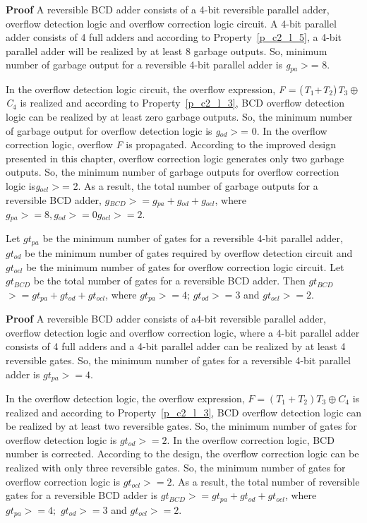 \noindent\textbf{Proof}
A reversible BCD adder consists of a 4-bit reversible parallel adder, overflow detection logic and overflow correction logic circuit. A {4}-bit parallel adder consists of 4 full adders and according to Property~\ref{p_c2_l_5}, a {4}-bit parallel adder will be realized by at least 8 garbage outputs. So, minimum number of garbage output for a reversible 4-bit parallel adder is {\it g}${}_{pa}$${>}$= 8.

In the overflow detection logic circuit, the overflow expression, {\it F }= ({\it T}${}_{1}$+{\it T}${}_{2}$){\it T}${}_{3}\oplus$ {\it C}${}_{4}$ is realized and according to Property~\ref{p_c2_l_3}, BCD overflow detection logic can be realized by at least zero garbage outputs. So, the minimum number of garbage output for overflow detection logic is {\it g}${}_{od}$${>}$= 0. In the overflow correction logic, overflow {\it F }is propagated. According to the improved design presented in this chapter, overflow correction logic generates only two garbage outputs. So, the minimum number of garbage outputs for overflow correction logic is{\it g}${}_{ocl}$${>}$= 2.
As a result, the total number of garbage outputs for a reversible BCD adder, $g{}_{BCD}$${>}= g{}_{pa} + g{}_{od} + g{}_{ocl}$, where $g{}_{pa}{>}= 8, g{}_{od}{>}= 0 g{}_{ocl}{>}= 2$.


\begin{property}\label{p_c2_l_7}\textnormal{
Let $gt_{pa}$ be the minimum number of gates for a reversible 4-bit parallel adder, $gt{}_{od}$ be the minimum number of gates required by overflow detection circuit and $gt{}_{ocl}$ be the minimum number of gates for overflow correction logic circuit. Let $gt{}_{BCD}$ be the total number of gates for a reversible BCD adder. Then
$gt{}_{BCD}$${>}= gt{}_{pa}+gt{}_{od}+gt{}_{ocl}$, where $gt{}_{pa}{>}= 4;\, gt{}_{od}{>}= 3$ and $gt{}_{ocl}{>}= 2.$}
\end{property}


\noindent\textbf{Proof}
A reversible BCD adder consists of a{4}-bit reversible parallel adder, overflow detection logic and overflow correction logic, where a {4}-bit parallel adder consists of 4 full adders and a {4}-bit parallel adder can be realized by at least 4 reversible gates. So, the minimum number of gates for a reversible {4}-bit parallel adder is $gt{}_{pa}$${>}= 4$.


In the overflow detection logic, the overflow expression, $F=(T{}_{1}+T{}_{2})T{}_{3}\oplus C{}_{4}$ is realized and according to Property~\ref{p_c2_l_3}, BCD overflow detection logic can be realized by at least two reversible gates. So, the minimum number of gates for overflow detection logic is $gt{}_{od}{>}= 2$. In the overflow correction logic, BCD number is corrected. According to the design, the overflow correction logic can be realized with only three reversible gates. So, the minimum number of gates for overflow correction logic is $gt{}_{ocl}{>}= 2$.
As a result, the total number of reversible gates for a reversible BCD adder is
$gt{}_{BCD}{>}= gt{}_{pa}+gt{}_{od}+gt{}_{ocl}$, where $gt{}_{pa}{>}= 4;$ $gt{}_{od}{>}= 3$ and $gt{}_{ocl}{>}= 2$.

